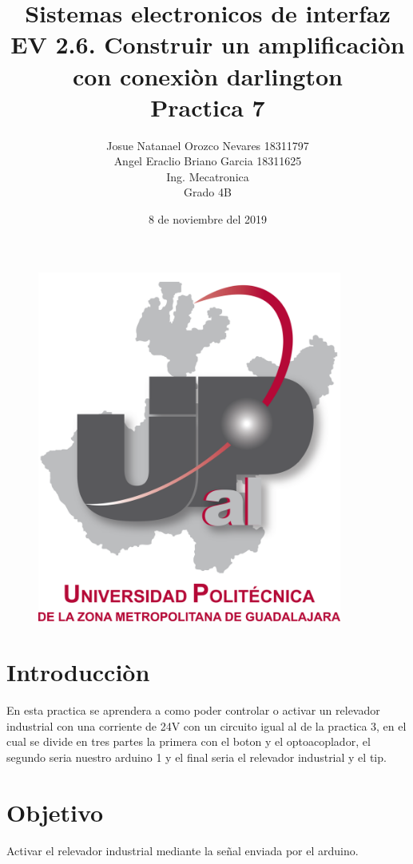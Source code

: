 \documentclass[12pt,a4paper]{article}
\begin{document}
\title{\textbf{Sistemas electronicos de interfaz\\EV 2.6. Construir un amplificaciòn con conexiòn darlington\\Practica 7}}
\author{Josue Natanael Orozco Nevares 18311797\\Angel Eraclio Briano Garcia 18311625\\Ing. Mecatronica\\Grado 4B}
\date{8 de noviembre del 2019}
\maketitle
\begin{figure}[h!]
\centering
\includegraphics[width=10cm]{UPCDLZMDG5783-logo.png} 
\end{figure}
\newpage

\section{Introducciòn}
En esta practica se aprendera a como poder controlar o activar un relevador industrial con una corriente de 24V con un circuito igual al de la practica 3, en el cual se divide en tres partes la primera con el boton y el optoacoplador, el segundo seria nuestro arduino 1 y el final seria el relevador industrial y el tip.


\section{Objetivo}
Activar el relevador industrial mediante la señal enviada por el arduino.
\end{document}
